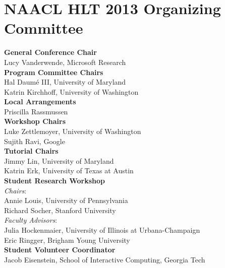 \markboth{}{} %
\markright{}{} %

\section*{NAACL HLT 2013 Organizing Committee}{}

\setlength{\parindent}{0pt}

{\bf General Conference Chair} \\
Lucy Vanderwende, Microsoft Research \\

{\bf Program Committee Chairs} \\
Hal Daumé III, University of Maryland \\
Katrin Kirchhoff, University of Washington \\

{\bf Local Arrangements} \\
Priscilla Rassmussen \\

{\bf Workshop Chairs} \\
Luke Zettlemoyer, University of Washington \\
Sujith Ravi, Google \\

{\bf Tutorial Chairs} \\
Jimmy Lin, University of Maryland \\
Katrin Erk, University of Texas at Austin \\

{\bf Student Research Workshop} \\
\emph{Chairs}: \\
\hspace*{5mm} Annie Louis, University of Pennsylvania \\
\hspace*{5mm} Richard Socher, Stanford University \\
\emph{Faculty Advisors}: \\
\hspace*{5mm} Julia Hockenmaier, University of Illinois at Urbana-Champaign \\
\hspace*{5mm} Eric Ringger, Brigham Young University \\

{\bf Student Volunteer Coordinator} \\
Jacob Eisenstein, School of Interactive Computing, Georgia Tech \\

